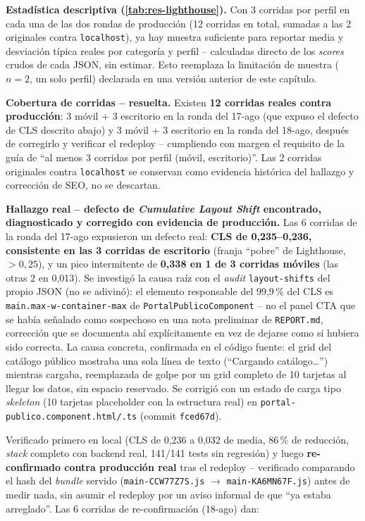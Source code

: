 \textbf{Estadística descriptiva (\autoref{tab:res-lighthouse}).} Con 3 corridas por perfil en cada una
de las dos rondas de producción (12 corridas en total, sumadas a las 2
originales contra \texttt{localhost}), ya hay muestra suficiente para
reportar media y desviación típica reales por categoría y perfil --
calculadas directo de los \emph{scores} crudos de cada JSON, sin
estimar. Esto reemplaza la limitación de muestra ($n=2$, un solo
perfil) declarada en una versión anterior de este capítulo.

\textbf{Cobertura de corridas -- resuelta.} Existen \textbf{12 corridas
reales contra producción}: 3 móvil + 3 escritorio en la ronda del
17-ago (que expuso el defecto de CLS descrito abajo) y 3 móvil + 3
escritorio en la ronda del 18-ago, después de corregirlo y verificar el
redeploy -- cumpliendo con margen el requisito de la guía de ``al menos
3 corridas por perfil (móvil, escritorio)''. Las 2 corridas originales
contra \texttt{localhost} se conservan como evidencia histórica del
hallazgo y corrección de SEO, no se descartan.

\textbf{Hallazgo real -- defecto de \emph{Cumulative Layout Shift}
encontrado, diagnosticado y corregido con evidencia de producción.}
Las 6 corridas de la ronda del 17-ago expusieron un defecto real:
\textbf{CLS de 0,235--0,236, consistente en las 3 corridas de
escritorio} (franja ``pobre'' de Lighthouse, $>0,25$), y un pico
intermitente de \textbf{0,338 en 1 de 3 corridas móviles} (las otras 2
en 0,013). Se investigó la causa raíz con el \emph{audit}
\texttt{layout-shifts} del propio JSON (no se adivinó): el elemento
responsable del 99,9\,\% del CLS es \texttt{main.max-w-container-max}
de \texttt{PortalPublicoComponent} -- no el panel CTA que se había
señalado como sospechoso en una nota preliminar de \texttt{REPORT.md},
corrección que se documenta ahí explícitamente en vez de dejarse como
si hubiera sido correcta. La causa concreta, confirmada en el código
fuente: el grid del catálogo público mostraba una sola línea de texto
(``Cargando catálogo\ldots'') mientras cargaba, reemplazada de golpe por
un grid completo de 10 tarjetas al llegar los datos, sin espacio
reservado. Se corrigió con un estado de carga tipo \emph{skeleton} (10
tarjetas placeholder con la estructura real) en
\texttt{portal-publico.component.html/.ts} (commit \texttt{fced67d}).

Verificado primero en local (CLS de 0,236 a 0,032 de media, 86\,\% de
reducción, \emph{stack} completo con backend real, 141/141 tests sin
regresión) y luego \textbf{re-confirmado contra producción real} tras
el redeploy -- verificado comparando el hash del \emph{bundle} servido
(\texttt{main-CCW77Z7S.js} $\to$ \texttt{main-KA6MN67F.js}) antes de
medir nada, sin asumir el redeploy por un aviso informal de que ``ya
estaba arreglado''. Las 6 corridas de re-confirmación (18-ago) dan:

